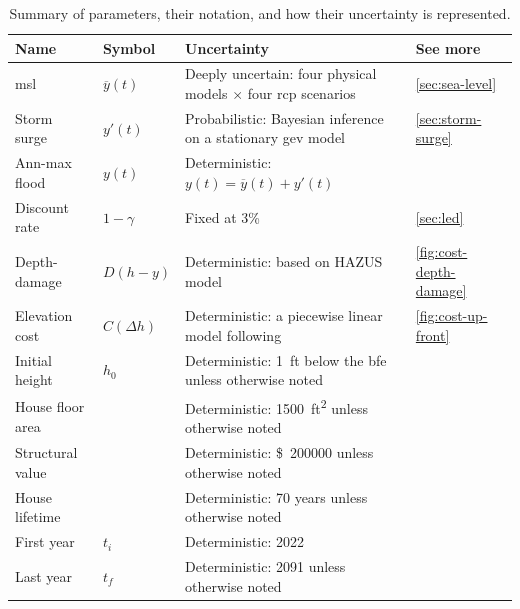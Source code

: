 \documentclass[11pt]{article}
\newcommand{\usd}[1]{\SI{#1}[\$]{}}
\begin{document}
\begin{table}
    \centering
    \caption{
        Summary of parameters, their notation, and how their uncertainty is represented.
    }\label{tab:uncertainties}
    \begin{tabular}{l l p{3in} l}
        \toprule
        Name             & Symbol            & Uncertainty                                                                          & See more                     \\
        \midrule
        \Gls{msl}        & $\overline{y}(t)$ & Deeply uncertain: four physical models $\times$ four \acrshort{rcp} scenarios        & \cref{sec:sea-level}         \\
        Storm surge      & $y'(t)$           & Probabilistic: Bayesian inference on a stationary \acrshort{gev} model               & \cref{sec:storm-surge}       \\
        Ann-max flood    & $y(t)$            & Deterministic: $y(t)=\overline{y}(t)+y'(t)$                                          &                              \\
        Discount rate    & $1-\gamma$        & Fixed at 3\%                                                                         & \cref{sec:led}               \\
        Depth-damage     & $D(h-y)$          & Deterministic: based on HAZUS model                                                  & \cref{fig:cost-depth-damage} \\
        Elevation cost   & $C(\Delta h)$     & Deterministic: a piecewise linear model following \citet{zarekarizi_suboptimal:2020} & \cref{fig:cost-up-front}     \\
        Initial height   & $h_0$             & Deterministic: \SI{1}{ft} below the \gls{bfe} unless otherwise noted                 &                              \\
        House floor area &                   & Deterministic: \SI{1500}{ft^2} unless otherwise noted                                &                              \\
        Structural value &                   & Deterministic: \usd{200000} unless otherwise noted                                   &                              \\
        House lifetime   &                   & Deterministic: 70 years unless otherwise noted                                       &                              \\
        First year       & $t_i$             & Deterministic: 2022                                                                  &                              \\
        Last year        & $t_f$             & Deterministic: 2091 unless otherwise noted                                           &                              \\
        \bottomrule
    \end{tabular}
\end{table}
\end{document}
